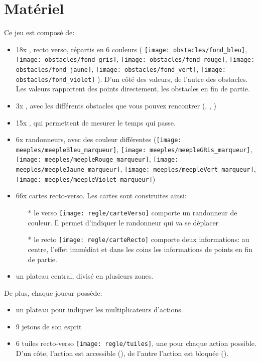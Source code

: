 \section*{Matériel} \label{sec:Matériel}

Ce jeu est composé de:
\begin{itemize}
\item 18x \jetonsObstacles, recto verso, répartis en 6 couleurs ( \texttt{[image: obstacles/fond\_bleu]}, 
\texttt{[image: obstacles/fond\_gris]}, \texttt{[image: obstacles/fond\_rouge]}, \texttt{[image: obstacles/fond\_jaune]}, \texttt{[image: obstacles/fond\_vert]}, \texttt{[image: obstacles/fond\_violet]} ). D'un côté des valeurs, de l'autre des obstacles. Les valeurs rapportent des points directement, les obstacles en fin de partie.
\item 3x \marqueursObstacles, avec les différents obstacles que vous pouvez rencontrer (\arbre, \tronc, \rocher)
\item 15x \jetonsMeteo, qui permettent de mesurer le temps qui passe.
\item 6x randonneurs, avec des couleur différentes (\texttt{[image: meeples/meepleBleu\_marqueur]}, \texttt{[image: meeples/meepleGRis\_marqueur]}, \texttt{[image: meeples/meepleRouge\_marqueur]}, \texttt{[image: meeples/meepleJaune\_marqueur]}, \texttt{[image: meeples/meepleVert\_marqueur]}, \texttt{[image: meeples/meepleViolet\_marqueur]})
\item 66x cartes recto-verso. Les cartes sont construites ainsi:
\begin{itemize}
\item[*] le verso \texttt{[image: regle/carteVerso]} comporte un randonneur de couleur. Il permet d'indiquer le randonneur qui va se déplacer
\item[*] le recto \texttt{[image: regle/carteRecto]} comporte deux informations: au centre, l'effet immédiat et dans les coins les informations de points en fin de partie.
\end{itemize}
\item un plateau central, divisé en plusieurs zones.
\end{itemize}

De plus, chaque joueur possède:
\begin{itemize}
\item un plateau pour indiquer les multiplicateurs d'actions.
\item 9 jetons de son esprit
\item 6 tuiles recto-verso \texttt{[image: regle/tuiles]}, une pour chaque action possible. D'un côte, l'action est accessible (\tuileActive), de l'autre l'action est bloquée (\tuileBloquee).
\end{itemize}

